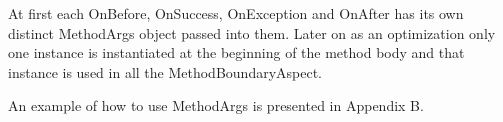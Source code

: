 At first each OnBefore, OnSuccess, OnException and OnAfter has its own distinct MethodArgs object passed into them. Later on as an optimization only one instance is instantiated at the beginning of the method body and that instance is used in all the MethodBoundaryAspect.

An example of how to use MethodArgs is presented in Appendix B.
%



%

